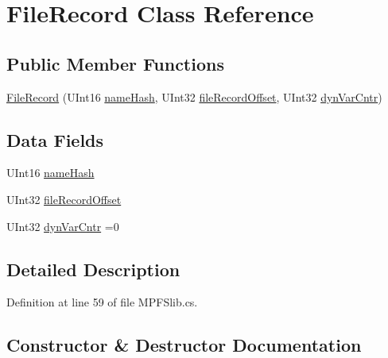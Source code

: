 \hypertarget{class_microchip_1_1_file_record}{}\section{File\+Record Class Reference}
\label{class_microchip_1_1_file_record}
\subsection*{Public Member Functions}
\begin{DoxyCompactItemize}
\item 
\hyperlink{class_microchip_1_1_file_record_a25fd44e7d3d49c19a3a430929c13a4fc}{File\+Record} (U\+Int16 \hyperlink{class_microchip_1_1_file_record_aeb0642208aa779de12a59f1cd4e7ee94}{name\+Hash}, U\+Int32 \hyperlink{class_microchip_1_1_file_record_a7b5f5f117fd6cc4622bb58d4c2c6ab15}{file\+Record\+Offset}, U\+Int32 \hyperlink{class_microchip_1_1_file_record_ad6a2e5dcfd91bd0260a8854183375acf}{dyn\+Var\+Cntr})
\end{DoxyCompactItemize}
\subsection*{Data Fields}
\begin{DoxyCompactItemize}
\item 
U\+Int16 \hyperlink{class_microchip_1_1_file_record_aeb0642208aa779de12a59f1cd4e7ee94}{name\+Hash}
\item 
U\+Int32 \hyperlink{class_microchip_1_1_file_record_a7b5f5f117fd6cc4622bb58d4c2c6ab15}{file\+Record\+Offset}
\item 
U\+Int32 \hyperlink{class_microchip_1_1_file_record_ad6a2e5dcfd91bd0260a8854183375acf}{dyn\+Var\+Cntr} =0
\end{DoxyCompactItemize}


\subsection{Detailed Description}


Definition at line 59 of file M\+P\+F\+Slib.\+cs.



\subsection{Constructor \& Destructor Documentation}
\hypertarget{class_microchip_1_1_file_record_a25fd44e7d3d49c19a3a430929c13a4fc}{}
